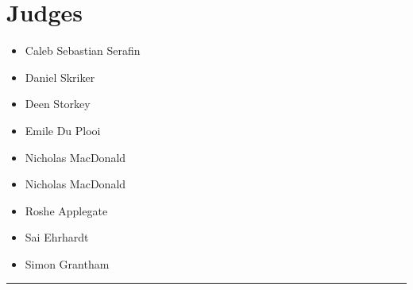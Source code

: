 \documentclass[10pt]{article}
\begin{document}
		\section*{\faUsers \: Judges}

		

	\begin{multicols}{2}

		\begin{itemize}
									\item Caleb Sebastian Serafin
									\item Daniel Skriker
									\item Deen Storkey
									\item Emile Du Plooi
									\item Nicholas MacDonald
						\end{itemize}

		\vfill\null
		\columnbreak

		\begin{itemize}
									\item Nicholas MacDonald
									\item Roshe Applegate
									\item Sai Ehrhardt
									\item Simon Grantham
						\end{itemize}

		\vfill\null

		\end{multicols}



			\vspace{0.5cm}
	\hrule
	\vspace{0.5cm}
\end{document}
